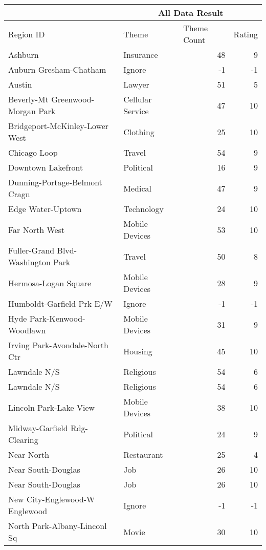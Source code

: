     \begin{tabular}{|l|l|r|r|}
    	\hline
          & \multicolumn{3}{|c|}{All Data Result} \\
          \hline
    Region ID & Theme & \multicolumn{1}{|l|}{Theme Count} & \multicolumn{1}{|l|}{Rating} \\
    \hline
    Ashburn & Insurance & 48    & 9 \\
    Auburn Gresham-Chatham & Ignore & -1    & -1 \\
    Austin & Lawyer & 51    & 5 \\
    Beverly-Mt Greenwood-Morgan Park & Cellular Service & 47    & 10 \\
    Bridgeport-McKinley-Lower West & Clothing & 25    & 10 \\
    Chicago Loop & Travel & 54    & 9 \\
    Downtown Lakefront & Political & 16    & 9 \\
    Dunning-Portage-Belmont Cragn & Medical & 47    & 9 \\
    Edge Water-Uptown & Technology & 24    & 10 \\
    Far North West & Mobile Devices & 53    & 10 \\
    Fuller-Grand Blvd-Washington Park & Travel & 50    & 8 \\
    Hermosa-Logan Square & Mobile Devices & 28    & 9 \\
    Humboldt-Garfield Prk E/W & Ignore & -1    & -1 \\
    Hyde Park-Kenwood-Woodlawn & Mobile Devices & 31    & 9 \\
    Irving Park-Avondale-North Ctr & Housing & 45    & 10 \\
    Lawndale N/S & Religious & 54    & 6 \\
    Lawndale N/S & Religious & 54    & 6 \\
    Lincoln Park-Lake View & Mobile Devices & 38    & 10 \\
    Midway-Garfield Rdg-Clearing & Political & 24    & 9 \\
    Near North & Restaurant & 25    & 4 \\
    Near South-Douglas & Job   & 26    & 10 \\
    Near South-Douglas & Job   & 26    & 10 \\
    New City-Englewood-W Englewood & Ignore & -1    & -1 \\
    North Park-Albany-Linconl Sq & Movie & 30    & 10 \\

\end{tabular}
